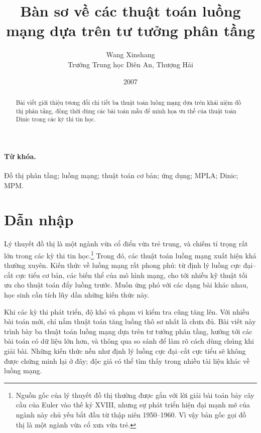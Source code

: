 \documentclass[11pt]{article}
\title{Bàn sơ về các thuật toán luồng mạng dựa trên tư tưởng phân tầng}
\author{Wang Xinshang\\Trường Trung học Diên An, Thượng Hải}
\date{2007}
\begin{document}
\maketitle


\begin{abstract}
Bài viết giới thiệu tương đối chi tiết ba thuật toán luồng mạng dựa trên khái
niệm đồ thị phân tầng, đồng thời dùng các bài toán mẫu để minh họa ưu thế của
thuật toán Dinic trong các kỳ thi tin học.
\end{abstract}

\paragraph{Từ khóa.}
Đồ thị phân tầng; luồng mạng; thuật toán cơ bản; ứng dụng; MPLA; Dinic; MPM.

\tableofcontents

\section{Dẫn nhập}

Lý thuyết đồ thị là một ngành vừa cổ điển vừa trẻ trung, và chiếm tỉ trọng rất
lớn trong các kỳ thi tin học.\footnote{Nguồn gốc của lý thuyết đồ thị thường
được gắn với lời giải bài toán bảy cây cầu của Euler vào thế kỷ XVIII, nhưng
sự phát triển hiện đại mạnh mẽ của ngành này chủ yếu bắt đầu từ thập niên
1950--1960. Vì vậy bản gốc gọi đồ thị là một ngành vừa cổ xưa vừa trẻ.} Trong
đó, các thuật toán luồng mạng xuất hiện khá thường xuyên. Kiến thức về luồng
mạng rất phong phú: từ định lý luồng cực đại--cắt cực tiểu cơ bản, các biến
thể của mô hình mạng, cho tới nhiều kỹ thuật tối ưu cho thuật toán đẩy luồng
trước. Muốn ứng phó với các dạng bài khác nhau, học sinh cần tích lũy dần
những kiến thức này.

Khi các kỳ thi phát triển, độ khó và phạm vi kiểm tra cũng tăng lên. Với nhiều
bài toán mới, chỉ nắm thuật toán tăng luồng thô sơ nhất là chưa đủ. Bài viết
này trình bày ba thuật toán luồng mạng dựa trên tư tưởng phân tầng, hướng tới
các bài toán có dữ liệu lớn hơn, và thông qua so sánh để làm rõ cách dùng
chúng khi giải bài. Những kiến thức nền như định lý luồng cực đại--cắt cực
tiểu sẽ không được chứng minh lại ở đây; độc giả có thể tìm thấy trong nhiều
tài liệu khác về luồng mạng.
\end{document}
